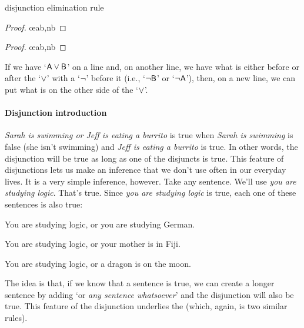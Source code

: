 \medskip
\begin{factboxy}{disjunction elimination rule}
\begin{proof}
	 \oe{ab,nb}
\end{proof}

\begin{proof}
	 \oe{ab,nb}
\end{proof}

\small{If we have `$\mathsf{A}\vee\mathsf{B}$' on a line and, on another line, we have what is either before or after the `$\vee$' with a `${\neg}$' before it (i.e., `${\neg}\mathsf{B}$' or `${\neg}\mathsf{A}$'), then, on a new line, we can put what is on the other side of the `$\vee$'.}

\end{factboxy}					%




\paragraph{Disjunction introduction}
\textit{Sarah is swimming or Jeff is eating a burrito} is true when \textit{Sarah is swimming} is false (she isn't swimming) and \textit{Jeff is eating a burrito} is true. In other words, the disjunction will be true as long as one of the disjuncts is true. This feature of disjunctions lets us make an inference that we don't use often in our everyday lives. It is a very simple inference, however. Take any sentence. We'll use \textit{you are studying logic}. That's true. Since \textit{you are studying logic} is true, each one of these sentences is also true:

\begin{ebullet}
	\item[] You are studying logic, {or} you are studying German.
	\item[] You are studying logic, {or} your mother is in Fiji.
	\item[] You are studying logic, {or} a dragon is on the moon.
\end{ebullet}

\noindent The idea is that, if we know that a sentence is true, we can create a longer sentence by adding `or \textit{any sentence whatsoever}' and the disjunction will also be true. This feature of the disjunction underlies the  (which, again, is two similar rules).


